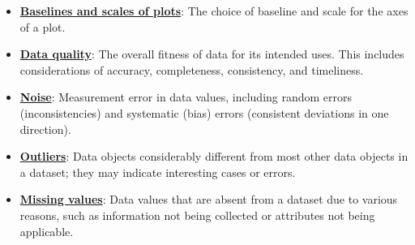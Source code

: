 \documentclass{article}%
\begin{document}
\begin{itemize}[leftmargin=*]
\item \href{https://purdue.brightspace.com/d2l/common/assets/pdfjs-d2l-dist/1.0.14-legacy/web/viewer.html?file=\%2Fcontent\%2Fenforced\%2F1095465-WL.202510.CS24200.LE1\%2F10L2-Vis.pdf\%3Fou\%3D1095465\&lang=en-us\&container=d2l-fileviewer-rendered-pdf\&fullscreen=d2l-fileviewer-rendered-pdf-dialog\&height=667#page=66}{\textbf{Baselines and scales of plots}}: The choice of baseline and scale for the axes of a plot.%
\end{itemize}%
\begin{itemize}[leftmargin=*]%
\item \href{https://purdue.brightspace.com/d2l/common/assets/pdfjs-d2l-dist/1.0.14-legacy/web/viewer.html?file=\%2Fcontent\%2Fenforced\%2F1095465-WL.202510.CS24200.LE1\%2F12-truth.pdf\%3Fou\%3D1095465\&lang=en-us\&container=d2l-fileviewer-rendered-pdf\&fullscreen=d2l-fileviewer-rendered-pdf-dialog\&height=667#page=2}{\textbf{Data quality}}: The overall fitness of data for its intended uses. This includes considerations of accuracy, completeness, consistency, and timeliness.%
\item \href{https://purdue.brightspace.com/d2l/common/assets/pdfjs-d2l-dist/1.0.14-legacy/web/viewer.html?file=\%2Fcontent\%2Fenforced\%2F1095465-WL.202510.CS24200.LE1\%2F12-truth.pdf\%3Fou\%3D1095465\&lang=en-us\&container=d2l-fileviewer-rendered-pdf\&fullscreen=d2l-fileviewer-rendered-pdf-dialog\&height=667#page=4}{\textbf{Noise}}: Measurement error in data values, including random errors (inconsistencies) and systematic (bias) errors (consistent deviations in one direction).%
\item \href{https://purdue.brightspace.com/d2l/common/assets/pdfjs-d2l-dist/1.0.14-legacy/web/viewer.html?file=\%2Fcontent\%2Fenforced\%2F1095465-WL.202510.CS24200.LE1\%2F12-truth.pdf\%3Fou\%3D1095465\&lang=en-us\&container=d2l-fileviewer-rendered-pdf\&fullscreen=d2l-fileviewer-rendered-pdf-dialog\&height=667#page=5}{\textbf{Outliers}}: Data objects considerably different from most other data objects in a dataset; they may indicate interesting cases or errors.%
\item \href{https://purdue.brightspace.com/d2l/common/assets/pdfjs-d2l-dist/1.0.14-legacy/web/viewer.html?file=\%2Fcontent\%2Fenforced\%2F1095465-WL.202510.CS24200.LE1\%2F12-truth.pdf\%3Fou\%3D1095465\&lang=en-us\&container=d2l-fileviewer-rendered-pdf\&fullscreen=d2l-fileviewer-rendered-pdf-dialog\&height=667#page=6}{\textbf{Missing values}}: Data values that are absent from a dataset due to various reasons, such as information not being collected or attributes not being applicable.%

\end{itemize}
\end{document}
